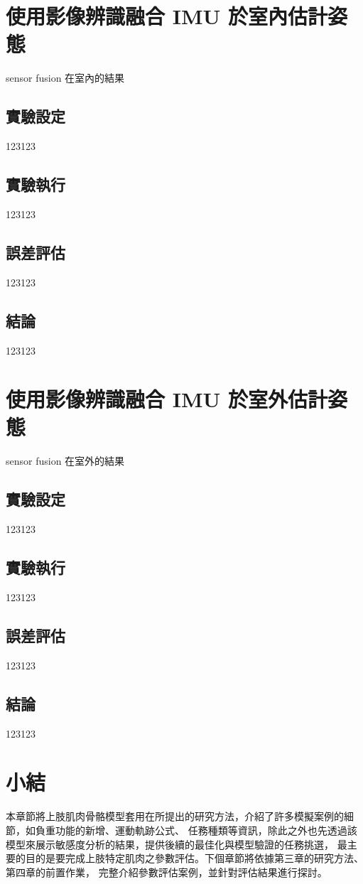 \section{使用影像辨識融合 IMU 於室內估計姿態}
sensor fusion 在室內的結果
\subsection{實驗設定}
123123
\subsection{實驗執行}
123123
\subsection{誤差評估}
123123
\subsection{結論}
123123

\section{使用影像辨識融合 IMU 於室外估計姿態}
sensor fusion 在室外的結果
\subsection{實驗設定}
123123
\subsection{實驗執行}
123123
\subsection{誤差評估}
123123
\subsection{結論}
123123

\section{小結}
本章節將上肢肌肉骨骼模型套用在所提出的研究方法，介紹了許多模擬案例的細節，如負重功能的新增、運動軌跡公式、
任務種類等資訊，除此之外也先透過該模型來展示敏感度分析的結果，提供後續的最佳化與模型驗證的任務挑選，
最主要的目的是要完成上肢特定肌肉之參數評估。下個章節將依據第三章的研究方法、第四章的前置作業，
完整介紹參數評估案例，並針對評估結果進行探討。

\clearpage